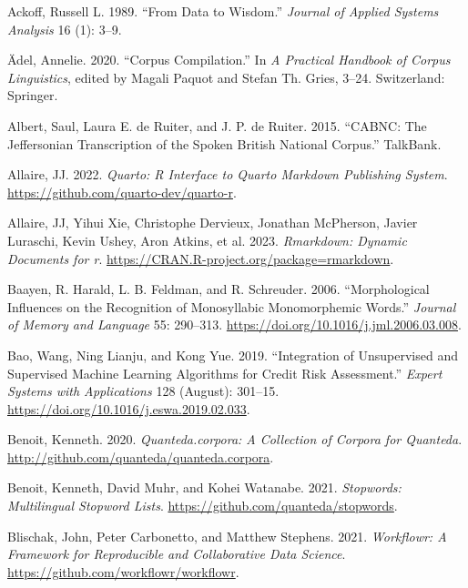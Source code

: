 \documentclass[
  letterpaper,
  DIV=11,
  numbers=noendperiod]{scrreport}
\newlength{\cslhangindent}
\newlength{\cslentryspacingunit} %
\newenvironment{CSLReferences}[2] %
 {%
  \setlength{\parindent}{0pt}
  \ifodd #1
  \let\oldpar\par
  \def\par{\hangindent=\cslhangindent\oldpar}
  \fi
  \setlength{\parskip}{#2\cslentryspacingunit}
 }%
 {}
\theoremstyle{definition}
\theoremstyle{remark}
\begin{document}
\hypertarget{refs}{}
\begin{CSLReferences}{1}{0}
\leavevmode{}%
Ackoff, Russell L. 1989. {``From Data to Wisdom.''} \emph{Journal of
Applied Systems Analysis} 16 (1): 3--9.

\leavevmode{}%
Ädel, Annelie. 2020. {``Corpus Compilation.''} In \emph{A Practical
Handbook of Corpus Linguistics}, edited by Magali Paquot and Stefan Th.
Gries, 3--24. Switzerland: Springer.

\leavevmode{}%
Albert, Saul, Laura E. de Ruiter, and J. P. de Ruiter. 2015. {``CABNC:
The Jeffersonian Transcription of the Spoken British National Corpus.''}
TalkBank.

\leavevmode{}%
Allaire, JJ. 2022. \emph{Quarto: R Interface to Quarto Markdown
Publishing System}. \url{https://github.com/quarto-dev/quarto-r}.

\leavevmode{}%
Allaire, JJ, Yihui Xie, Christophe Dervieux, Jonathan McPherson, Javier
Luraschi, Kevin Ushey, Aron Atkins, et al. 2023. \emph{Rmarkdown:
Dynamic Documents for r}.
\url{https://CRAN.R-project.org/package=rmarkdown}.

\leavevmode{}%
Baayen, R. Harald, L. B. Feldman, and R. Schreuder. 2006.
{``Morphological Influences on the Recognition of Monosyllabic
Monomorphemic Words.''} \emph{Journal of Memory and Language} 55:
290--313. \url{https://doi.org/10.1016/j.jml.2006.03.008}.

\leavevmode{}%
Bao, Wang, Ning Lianju, and Kong Yue. 2019. {``Integration of
Unsupervised and Supervised Machine Learning Algorithms for Credit Risk
Assessment.''} \emph{Expert Systems with Applications} 128 (August):
301--15. \url{https://doi.org/10.1016/j.eswa.2019.02.033}.

\leavevmode{}%
Benoit, Kenneth. 2020. \emph{Quanteda.corpora: A Collection of Corpora
for Quanteda}. \url{http://github.com/quanteda/quanteda.corpora}.

\leavevmode{}%
Benoit, Kenneth, David Muhr, and Kohei Watanabe. 2021. \emph{Stopwords:
Multilingual Stopword Lists}.
\url{https://github.com/quanteda/stopwords}.

\leavevmode{}%
Blischak, John, Peter Carbonetto, and Matthew Stephens. 2021.
\emph{Workflowr: A Framework for Reproducible and Collaborative Data
Science}. \url{https://github.com/workflowr/workflowr}.


\end{CSLReferences}
\end{document}
